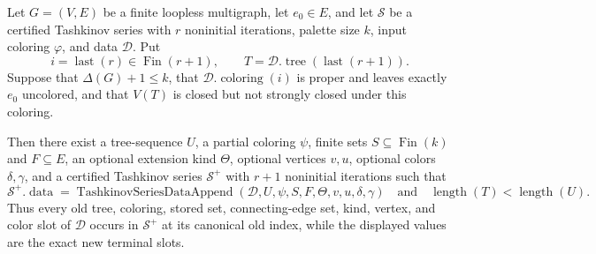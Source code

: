 \begin{theorem}
Let \(G=(V,E)\) be a finite loopless multigraph, let \(e_0\in E\),
and let \(\mathcal S\) be a certified Tashkinov series with \(r\)
noninitial iterations, palette size \(k\), input coloring \(\varphi\),
and data \(\mathcal D\).  Put
\[
 i=\operatorname{last}(r)\in\operatorname{Fin}(r+1),\qquad
 T=\mathcal D.\operatorname{tree}(\operatorname{last}(r+1)).
\]
Suppose that \(\Delta(G)+1\leq k\), that
\(\mathcal D.\operatorname{coloring}(i)\) is proper and leaves exactly
\(e_0\) uncolored, and that \(V(T)\) is closed but not strongly closed
under this coloring.

Then there exist a tree-sequence \(U\), a partial coloring \(\psi\),
finite sets \(S\subseteq\operatorname{Fin}(k)\) and \(F\subseteq E\),
an optional extension kind \(\Theta\), optional vertices \(v,u\),
optional colors \(\delta,\gamma\), and a certified Tashkinov series
\(\mathcal S^+\) with \(r+1\) noninitial iterations such that
\[
 \mathcal S^+.\operatorname{data}
   =\operatorname{TashkinovSeriesDataAppend}
      (\mathcal D,U,\psi,S,F,\Theta,v,u,\delta,\gamma)
 \quad\text{and}\quad
 \operatorname{length}(T)<\operatorname{length}(U).
\]
Thus every old tree, coloring, stored set, connecting-edge set, kind,
vertex, and color slot of \(\mathcal D\) occurs in \(\mathcal S^+\) at
its canonical old index, while the displayed values are the exact new
terminal slots.
\end{theorem}

